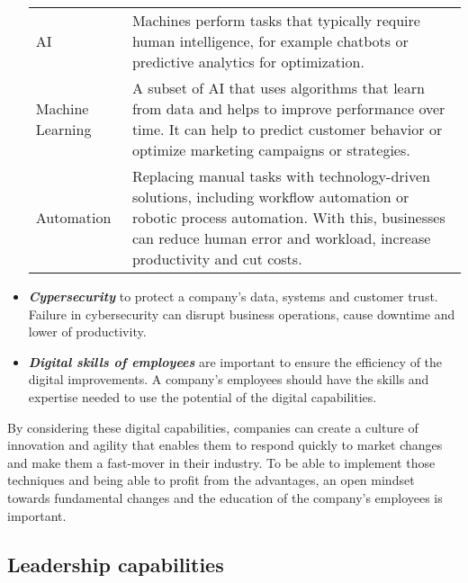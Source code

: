 \documentclass[a4]{scrartcl}
\begin{document}
\begin{itemize}
\begin{tabular}{l|p{10.5cm}}
			AI & Machines perform tasks that typically require human intelligence, for example chatbots or predictive analytics for  optimization.~\cite{ai, ai2}\\
			
			Machine Learning & A subset of AI that uses algorithms that learn from data and helps to improve performance over time. It can help to predict customer behavior or optimize marketing campaigns or strategies.~\cite{ai2}\\
			
			Automation & Replacing manual tasks with technology-driven solutions, including workflow automation or robotic process automation. With this, businesses can reduce human error and workload, increase productivity and cut costs.~\cite{ai2}\\
			
		\end{tabular}
		
		
		\item 	\textit{\textbf{Cypersecurity}} to protect a company's data, systems and customer trust. Failure in cybersecurity can disrupt business operations, cause downtime and lower of productivity.~\cite{cybersecurity}
		
		
		
		\item \textit{\textbf{Digital skills of employees}} are important to ensure the efficiency of the digital improvements. A company's employees should have the skills and expertise needed to use the potential of the digital capabilities.
		
		
		
	\end{itemize}
	

	By considering these digital capabilities, companies can create a culture of innovation and agility that enables them to respond quickly to market changes and make them a fast-mover in their industry. To be able to implement those techniques and being able to profit from the advantages, an open mindset towards fundamental changes and the education of the company's employees is important.
	
	
	
	
	
	
	
	
	\subsection{Leadership capabilities} \label{subsec:leadershipcapabilities}
	
\end{document}
